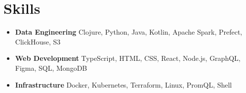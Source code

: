 \documentclass[letterpaper,11pt]{article}
\newcommand{\resumeItem}[2]{
  \item\small{
    \textbf{#1}{ #2 \vspace{-2pt}}
  }
}
\newcommand{\resumeSubItem}[2]{\resumeItem{#1}{#2}\vspace{-4pt}}
\newcommand{\resumeSubHeadingListStart}{\begin{itemize}[leftmargin=*]}
\newcommand{\resumeSubHeadingListEnd}{\end{itemize}}
\begin{document}
\section{Skills}
 \resumeSubHeadingListStart
    \resumeSubItem{Data Engineering}
      {Clojure, Python, Java, Kotlin, Apache Spark, Prefect, ClickHouse, S3}
    \resumeSubItem{Web Development}
      {TypeScript, HTML, CSS, React, Node.js, GraphQL, Figma, SQL, MongoDB}
    \resumeSubItem{Infrastructure}
      {Docker, Kubernetes, Terraform, Linux, PromQL, Shell}
 \resumeSubHeadingListEnd
\end{document}
